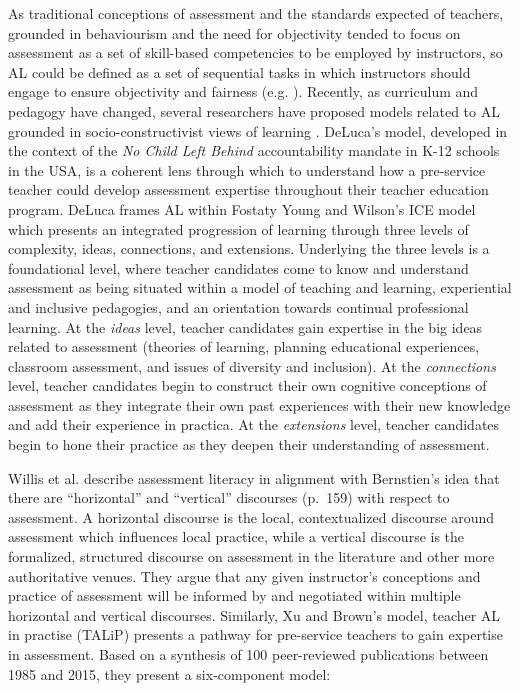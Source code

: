 \documentclass[
]{book}
\begin{document}
As traditional conceptions of assessment and the standards expected of teachers, grounded in behaviourism and the need for objectivity tended to focus on assessment as a set of skill-based competencies to be employed by instructors, so AL could be defined as a set of sequential tasks in which instructors should engage to ensure objectivity and fairness (e.g. \citep{natrielloImpactEvaluationProcesses1987}). Recently, as curriculum and pedagogy have changed, several researchers have proposed models related to AL grounded in socio-constructivist views of learning \citep{delucaPreparingTeachersAge2012, pastoreTeacherAssessmentLiteracy2019, xuTeacherAssessmentLiteracy2016}. DeLuca's \citeyearpar{delucaPreparingTeachersAge2012} model, developed in the context of the \emph{No Child Left Behind} accountability mandate in K-12 schools in the USA, is a coherent lens through which to understand how a pre-service teacher could develop assessment expertise throughout their teacher education program. DeLuca frames AL within Fostaty Young and Wilson's \citeyearpar{fostatyyoungAssessmentLearningICE2000} ICE model which presents an integrated progression of learning through three levels of complexity, ideas, connections, and extensions. Underlying the three levels is a foundational level, where teacher candidates come to know and understand assessment as being situated within a model of teaching and learning, experiential and inclusive pedagogies, and an orientation towards continual professional learning. At the \emph{ideas} level, teacher candidates gain expertise in the big ideas related to assessment (theories of learning, planning educational experiences, classroom assessment, and issues of diversity and inclusion). At the \emph{connections} level, teacher candidates begin to construct their own cognitive conceptions of assessment as they integrate their own past experiences with their new knowledge and add their experience in practica. At the \emph{extensions} level, teacher candidates begin to hone their practice as they deepen their understanding of assessment.

Willis et al. \citeyearpar{willisConceptualisingTeachersAssessment2013} describe assessment literacy in alignment with Bernstien's \citeyearpar{bernsteinVerticalHorizontalDiscourse1999} idea that there are ``horizontal'' and ``vertical'' discourses (p.~159) with respect to assessment. A horizontal discourse is the local, contextualized discourse around assessment which influences local practice, while a vertical discourse is the formalized, structured discourse on assessment in the literature and other more authoritative venues. They argue that any given instructor's conceptions and practice of assessment will be informed by and negotiated within multiple horizontal and vertical discourses. Similarly, Xu and Brown's \citeyearpar{xuTeacherAssessmentLiteracy2016} model, teacher AL in practise (TALiP) presents a pathway for pre-service teachers to gain expertise in assessment. Based on a synthesis of 100 peer-reviewed publications between 1985 and 2015, they present a six-component model:
\end{document}
